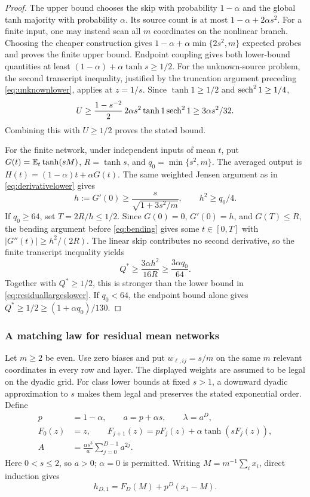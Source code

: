 \begin{proof}
The upper bound chooses the skip with probability $1-\alpha$
and the global tanh majority with probability $\alpha$.
Its source count is at most $1-\alpha+2\alpha s^2$.
For a finite input, one may instead scan all $m$ coordinates on
the nonlinear branch. Choosing the cheaper construction gives
$1-\alpha+\alpha\min\{2s^2,m\}$ expected probes and proves
the finite upper bound.
Endpoint coupling gives both lower-bound quantities at least
$(1-\alpha)+\alpha\tanh s\ge1/2$.
For the unknown-source problem, the second transcript inequality,
justified by the truncation argument preceding
\eqref{eq:unknownlower}, applies at $z=1/s$.
Since $\tanh1\ge1/2$ and $\operatorname{sech}^2 1\ge1/4$,
\[
U\ge\frac{1-s^{-2}}2\,2\alpha s^2\tanh1\operatorname{sech}^21
\ge3\alpha s^2/32.
\]
Combining this with $U\ge1/2$ proves the stated bound.

For the finite network, under independent inputs of mean $t$,
put $G(t)=\mathbb E_t\tanh(sM)$, $R=\tanh s$, and
$q_0=\min\{s^2,m\}$. The averaged output is
$H(t)=(1-\alpha)t+\alpha G(t)$.
The same weighted Jensen argument as in
\eqref{eq:derivativelower} gives
\[
h:=G'(0)\ge\frac{s}{\sqrt{1+3s^2/m}},
\qquad h^2\ge q_0/4.
\]
If $q_0\ge64$, set $T=2R/h\le1/2$.
Since $G(0)=0$, $G'(0)=h$, and $G(T)\le R$, the bending argument
before \eqref{eq:bending} gives some $t\in[0,T]$ with
$|G''(t)|\ge h^2/(2R)$.
The linear skip contributes no second derivative, so the finite
transcript inequality yields
\[
Q^*\ge\frac{3\alpha h^2}{16R}
\ge\frac{3\alpha q_0}{64}.
\]
Together with $Q^*\ge1/2$, this is stronger than the lower bound
in \eqref{eq:residuallargeslower}.
If $q_0<64$, the endpoint bound alone gives
$Q^*\ge1/2\ge(1+\alpha q_0)/130$.
\end{proof}



\subsubsection{A matching law for residual mean networks}

Let $m\ge2$ be even. Use zero biases and put $w_{\ell,ij}=s/m$
on the same $m$ relevant coordinates in every row and layer.
The displayed weights are assumed to be legal on the dyadic grid.
For class lower bounds at fixed $s>1$, a downward dyadic
approximation to $s$ makes them legal and preserves the stated
exponential order.
Define
\begin{equation}\label{eq:reschainparameters}
\begin{aligned}
p&=1-\alpha,\qquad a=p+\alpha s,\qquad \lambda=a^D,\\
F_0(z)&=z,\qquad
F_{j+1}(z)=pF_j(z)+\alpha\tanh(sF_j(z)),\\
A&=\frac{\alpha s^3}{a}\sum_{j=0}^{D-1}a^{2j}.
\end{aligned}
\end{equation}
Here $0<s\le2$, so $a>0$; $\alpha=0$ is permitted.
Writing $M=m^{-1}\sum_i x_i$, direct induction gives
\begin{equation}\label{eq:resmeanidentity}
h_{D,1}=F_D(M)+p^D(x_1-M).
\end{equation}

